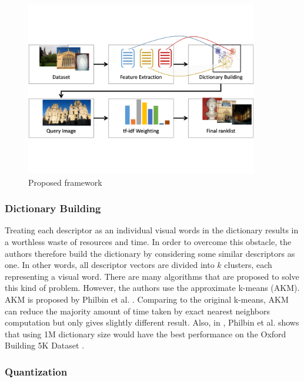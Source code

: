 \begin{figure}
    \centering
    \includegraphics[width=4.0in]{process.pdf}
    \caption{Proposed framework}
    \label{fig:proposed_framework}
\end{figure}

\subsubsection{Dictionary Building} \label{section:dictionary_building}
Treating each descriptor as an individual visual words in the dictionary results in a worthless waste of resources and time. In order to overcome this obstacle, the authors therefore build the dictionary by considering some similar descriptors as one. In other words, all descriptor vectors are divided into $k$ clusters, each representing a visual word. There are many algorithms that are proposed to solve this kind of problem. However, the authors use the approximate k-means (AKM). AKM is proposed by Philbin et al. \cite{2}. Comparing to the original k-means, AKM can reduce the majority amount of time taken by exact nearest neighbors computation but only gives slightly different result. Also, in \cite{2}, Philbin et al. shows that using 1M dictionary size would have the best performance on the Oxford Building 5K Dataset \cite{oxbuilding}.

\subsubsection{Quantization} \label{section:quantization}

